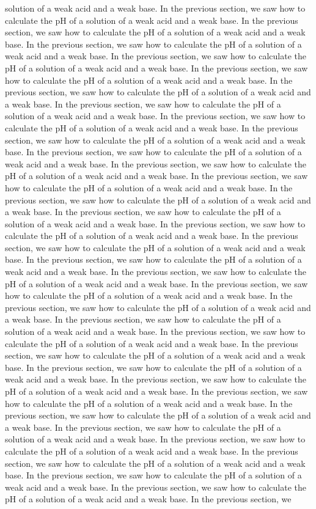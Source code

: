 \documentclass[11pt]{article}
\begin{document}
solution of a weak acid and a weak base. In the previous section, we saw how to calculate the pH of a solution of a weak acid and a weak base. In the previous section, we saw how to calculate the pH of a solution of a weak acid and a weak base. In the previous section, we saw how to calculate the pH of a solution of a weak acid and a weak base. In the previous section, we saw how to calculate the pH of a solution of a weak acid and a weak base. In the previous section, we saw how to calculate the pH of a solution of a weak acid and a weak base. In the previous section, we saw how to calculate the pH of a solution of a weak acid and a weak base. In the previous section, we saw how to calculate the pH of a solution of a weak acid and a weak base. In the previous section, we saw how to calculate the pH of a solution of a weak acid and a weak base. In the previous section, we saw how to calculate the pH of a solution of a weak acid and a weak base. In the previous section, we saw how to calculate the pH of a solution of a weak acid and a weak base. In the previous section, we saw how to calculate the pH of a solution of a weak acid and a weak base. In the previous section, we saw how to calculate the pH of a solution of a weak acid and a weak base. In the previous section, we saw how to calculate the pH of a solution of a weak acid and a weak base. In the previous section, we saw how to calculate the pH of a solution of a weak acid and a weak base. In the previous section, we saw how to calculate the pH of a solution of a weak acid and a weak base. In the previous section, we saw how to calculate the pH of a solution of a weak acid and a weak base. In the previous section, we saw how to calculate the pH of a solution of a weak acid and a weak base. In the previous section, we saw how to calculate the pH of a solution of a weak acid and a weak base. In the previous section, we saw how to calculate the pH of a solution of a weak acid and a weak base. In the previous section, we saw how to calculate the pH of a solution of a weak acid and a weak base. In the previous section, we saw how to calculate the pH of a solution of a weak acid and a weak base. In the previous section, we saw how to calculate the pH of a solution of a weak acid and a weak base. In the previous section, we saw how to calculate the pH of a solution of a weak acid and a weak base. In the previous section, we saw how to calculate the pH of a solution of a weak acid and a weak base. In the previous section, we saw how to calculate the pH of a solution of a weak acid and a weak base. In the previous section, we saw how to calculate the pH of a solution of a weak acid and a weak base. In the previous section, we saw how to calculate the pH of a solution of a weak acid and a weak base. In the previous section, we saw how to calculate the pH of a solution of a weak acid and a weak base. In the previous section, we saw how to calculate the pH of a solution of a weak acid and a weak base. In the previous section, we saw how to calculate the pH of a solution of a weak acid and a weak base. In the previous section, we saw how to calculate the pH of a solution of a weak acid and a weak base. In the previous section, we saw how to calculate the pH of a solution of a weak acid and a weak base. In the previous section, we 
\end{document}
